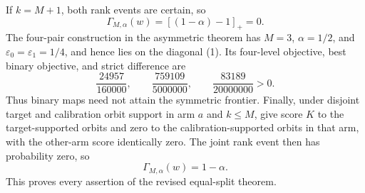 If \(k=M+1\), both rank events are certain, so
\[
\Gamma_{M,\alpha}(w)=[(1-\alpha)-1]_+=0. \tag{12}
\]
The four-pair construction in the asymmetric theorem has \(M=3\), \(\alpha=1/2\), and \(\varepsilon_0=\varepsilon_1=1/4\), and hence lies on the diagonal (1). Its four-level objective, best binary objective, and strict difference are
\[
\frac{24957}{160000},\qquad \frac{759109}{5000000},\qquad \frac{83189}{20000000}>0. \tag{13}
\]
Thus binary maps need not attain the symmetric frontier. Finally, under disjoint target and calibration orbit support in arm \(a\) and \(k\le M\), give score \(K\) to the target-supported orbits and zero to the calibration-supported orbits in that arm, with the other-arm score identically zero. The joint rank event then has probability zero, so
\[
\Gamma_{M,\alpha}(w)=1-\alpha. \tag{14}
\]
This proves every assertion of the revised equal-split theorem.
